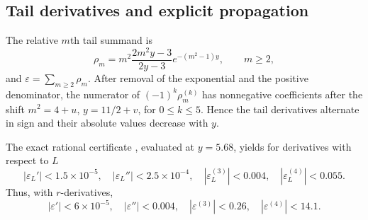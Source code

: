 \documentclass{amsart}
\numberwithin{equation}{section}
\theoremstyle{definition}
\theoremstyle{remark}
\begin{document}
\subsection{Tail derivatives and explicit propagation}
The relative $m$th tail summand is
\begin{equation}\label{eq:rhodirect}
 \rho_m=m^2\frac{2m^2y-3}{2y-3}e^{-(m^2-1)y},\qquad m\ge2,
\end{equation}
and $\varepsilon=\sum_{m\ge2}\rho_m$.  After removal of the exponential and the positive denominator, the numerator of $(-1)^k\rho_m^{(k)}$ has nonnegative coefficients after the shift $m^2=4+u$, $y=11/2+v$, for $0\le k\le5$.  Hence the tail derivatives alternate in sign and their absolute values decrease with $y$.

The exact rational certificate , evaluated at $y=5.68$, yields for derivatives with respect to $L$
\begin{equation}\label{eq:epsL}
 |\varepsilon_L'|<1.5\!\times\!10^{-5},\quad
 |\varepsilon_L''|<2.5\!\times\!10^{-4},\quad
 |\varepsilon_L^{(3)}|<0.004,\quad
 |\varepsilon_L^{(4)}|<0.055.
\end{equation}
Thus, with $r$-derivatives,
\begin{equation}\label{eq:epsr}
 |\varepsilon'|<6\!\times\!10^{-5},\quad
 |\varepsilon''|<0.004,\quad
 |\varepsilon^{(3)}|<0.26,\quad
 |\varepsilon^{(4)}|<14.1.
\end{equation}
\end{document}
